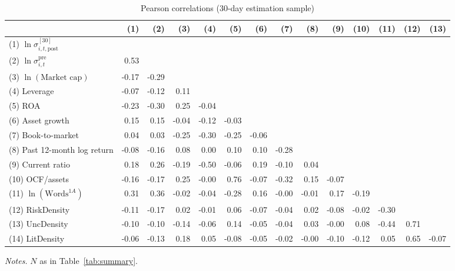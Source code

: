 \begin{table}[htbp]
\centering
\caption{Pearson correlations (30-day estimation sample)}
\label{tab:correlation}
\scriptsize
\setlength{\tabcolsep}{2.5pt}
\begin{tabular}{lrrrrrrrrrrrrr}
\toprule
 & (1) & (2) & (3) & (4) & (5) & (6) & (7) & (8) & (9) & (10) & (11) & (12) & (13) \\
\midrule
(1) $\ln\sigma^{[30]}_{i,t,\mathrm{post}}$ &  &  &  &  &  &  &  &  &  &  &  &  &  \\
(2) $\ln\sigma^{\mathrm{pre}}_{i,t}$ & 0.53 &  &  &  &  &  &  &  &  &  &  &  &  \\
(3) $\ln(\text{Market cap})$ & -0.17 & -0.29 &  &  &  &  &  &  &  &  &  &  &  \\
(4) Leverage & -0.07 & -0.12 & 0.11 &  &  &  &  &  &  &  &  &  &  \\
(5) ROA & -0.23 & -0.30 & 0.25 & -0.04 &  &  &  &  &  &  &  &  &  \\
(6) Asset growth & 0.15 & 0.15 & -0.04 & -0.12 & -0.03 &  &  &  &  &  &  &  &  \\
(7) Book-to-market & 0.04 & 0.03 & -0.25 & -0.30 & -0.25 & -0.06 &  &  &  &  &  &  &  \\
(8) Past 12-month log return & -0.08 & -0.16 & 0.08 & 0.00 & 0.10 & 0.10 & -0.28 &  &  &  &  &  &  \\
(9) Current ratio & 0.18 & 0.26 & -0.19 & -0.50 & -0.06 & 0.19 & -0.10 & 0.04 &  &  &  &  &  \\
(10) OCF/assets & -0.16 & -0.17 & 0.25 & -0.00 & 0.76 & -0.07 & -0.32 & 0.15 & -0.07 &  &  &  &  \\
(11) $\ln(\text{Words}^{1A})$ & 0.31 & 0.36 & -0.02 & -0.04 & -0.28 & 0.16 & -0.00 & -0.01 & 0.17 & -0.19 &  &  &  \\
(12) RiskDensity & -0.11 & -0.17 & 0.02 & -0.01 & 0.06 & -0.07 & -0.04 & 0.02 & -0.08 & -0.02 & -0.30 &  &  \\
(13) UncDensity & -0.10 & -0.10 & -0.14 & -0.06 & 0.14 & -0.05 & -0.04 & 0.03 & -0.00 & 0.08 & -0.44 & 0.71 &  \\
(14) LitDensity & -0.06 & -0.13 & 0.18 & 0.05 & -0.08 & -0.05 & -0.02 & -0.00 & -0.10 & -0.12 & 0.05 & 0.65 & -0.07 \\
\bottomrule
\end{tabular}
\par\smallskip
\begin{minipage}{\linewidth}\footnotesize
\emph{Notes.} $N$ as in Table~\ref{tab:summary}.
\end{minipage}
\end{table}

